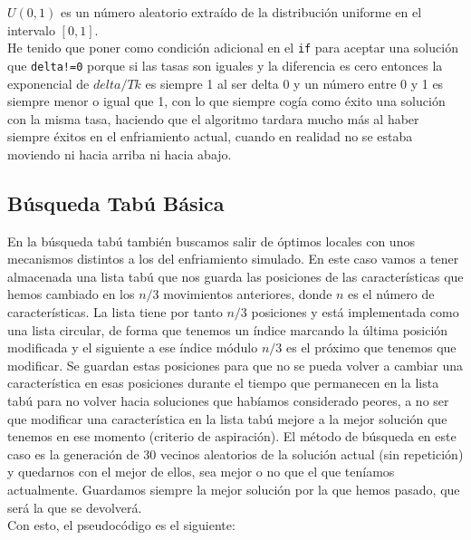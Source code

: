 \documentclass[12pt]{article}
\begin{document}
$U(0,1)$ es un número aleatorio extraído de la distribución uniforme en el intervalo $[0,1]$.\\

He tenido que poner como condición adicional en el \texttt{if} para aceptar una solución que \texttt{delta!=0} porque si las tasas son iguales y la diferencia es cero entonces la exponencial de $delta/Tk$ es siempre 1 al ser delta 0 y un número entre 0 y 1 es siempre menor o igual que 1, con lo que siempre cogía como éxito una solución con la misma tasa, haciendo que el algoritmo tardara mucho más al haber siempre éxitos en el enfriamiento actual, cuando en realidad no se estaba moviendo ni hacia arriba ni hacia abajo.

\subsection{Búsqueda Tabú Básica}
En la búsqueda tabú también buscamos salir de óptimos locales con unos mecanismos distintos a los del enfriamiento simulado. En este caso vamos a tener almacenada una lista tabú que nos guarda las posiciones de las características que hemos cambiado en los $n/3$ movimientos anteriores, donde $n$ es el número de características.  La lista tiene por tanto $n/3$ posiciones y está implementada como una lista circular, de forma que tenemos un índice marcando la última posición modificada y el siguiente a ese índice módulo $n/3$ es el próximo que tenemos que modificar. Se guardan estas posiciones para que no se pueda volver a cambiar una característica en esas posiciones durante el tiempo que permanecen en la lista tabú para no volver hacia soluciones que habíamos considerado peores, a no ser que modificar una característica en la lista tabú mejore a la mejor solución que tenemos en ese momento (criterio de aspiración). El método de búsqueda en este caso es la generación de 30 vecinos aleatorios de la solución actual (sin repetición) y quedarnos con el mejor de ellos, sea mejor o no que el que teníamos actualmente. Guardamos siempre la mejor solución por la que hemos pasado, que será la que se devolverá.\\
Con esto, el pseudocódigo es el siguiente:
\end{document}
